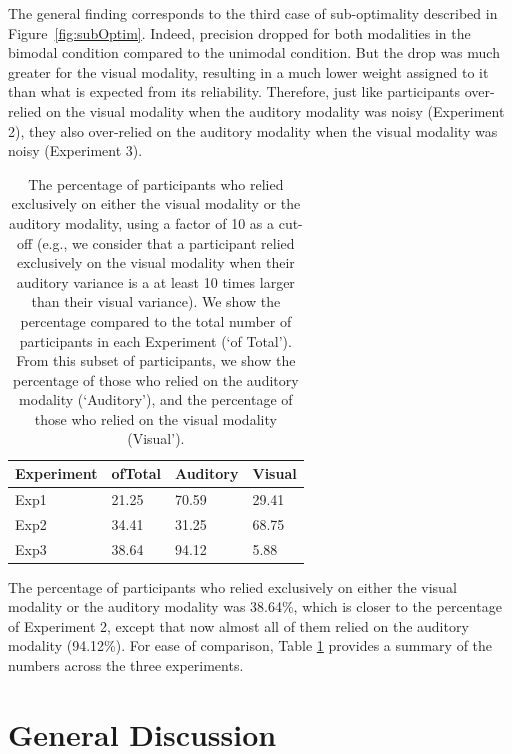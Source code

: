 \documentclass[english,floatsintext,man]{apa6}
\theoremstyle{definition}
\theoremstyle{definition}
\theoremstyle{definition}
\theoremstyle{remark}
\begin{document}
The general finding corresponds to the third case of sub-optimality
described in Figure~\ref{fig:subOptim}. Indeed, precision dropped for
both modalities in the bimodal condition compared to the unimodal
condition. But the drop was much greater for the visual modality,
resulting in a much lower weight assigned to it than what is expected
from its reliability. Therefore, just like participants over-relied on
the visual modality when the auditory modality was noisy (Experiment 2),
they also over-relied on the auditory modality when the visual modality
was noisy (Experiment 3).

\begin{table}[tbp]
\begin{center}
\begin{threeparttable}
\caption{\label{tab:exclusive}The percentage of participants who relied exclusively on either the visual modality or the auditory modality, using a factor of 10 as a cut-off (e.g., we consider that a participant relied exclusively on the visual modality when their auditory variance is a at least 10 times larger than their visual variance). We show the percentage compared to the total number of participants in each Experiment (`of Total'). From this subset of participants, we show the percentage of those who relied on the  auditory modality (`Auditory'), and the percentage of those who relied on the visual  modality (Visual').}
\begin{tabular}{llll}
\toprule
Experiment & \multicolumn{1}{c}{ofTotal} & \multicolumn{1}{c}{Auditory} & \multicolumn{1}{c}{Visual}\\
\midrule
Exp1 & 21.25 & 70.59 & 29.41\\
Exp2 & 34.41 & 31.25 & 68.75\\
Exp3 & 38.64 & 94.12 & 5.88\\
\bottomrule
\end{tabular}
\end{threeparttable}
\end{center}
\end{table}

The percentage of participants who relied exclusively on either the
visual modality or the auditory modality was 38.64\%, which is closer to
the percentage of Experiment 2, except that now almost all of them
relied on the auditory modality (94.12\%). For ease of comparison, Table
\ref{tab:exclusive} provides a summary of the numbers across the three
experiments.

\section{General Discussion}\label{general-discussion}
\end{document}
